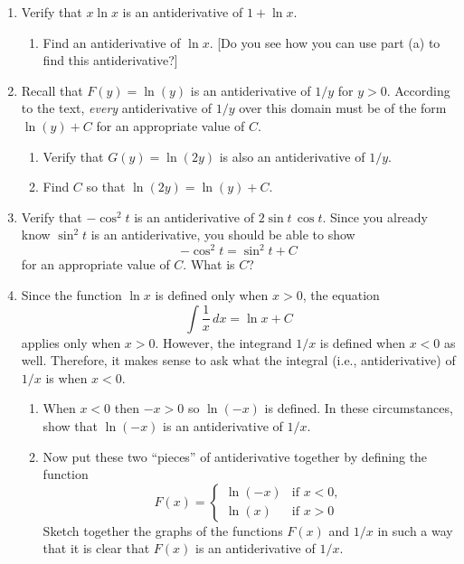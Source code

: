 \begin{enumerate}
\begin{enumerate}
\end{enumerate}
\item Verify that $x \ln{x}$ is an antiderivative of $1 + \ln{x}$.

  \begin{enumerate}
  \item Find an antiderivative of $\ln{x}$.  [Do you see how you can use
  part (a) to find this antiderivative?]



\end{enumerate}
\item Recall that $F(y) = \ln(y)$ is an antiderivative of $1/y$ for
$y>0$.  According to the text, {\em every\/} antiderivative of $1/y$
over this domain must be of the form $\ln(y) + C$ for an appropriate
value of $C$.

  \begin{enumerate}
  \item Verify that $G(y) = \ln(2y)$ is also an antiderivative of $1/y$.

  \item Find $C$ so that $\ln(2y) = \ln(y) + C$.


\end{enumerate}
\item Verify that $-\cos^2{t}$ is an antiderivative of $2\sin{t} \,
\cos{t}$.  Since you already know $\sin^2{t}$ is an antiderivative,
you should be able to show
	\[
-\cos^2{t} = \sin^2{t} + C
\]
for an appropriate value of $C$.  What is $C$?


\item Since\label{log} the function $\ln{x}$ is defined only when $x >
0$, the equation
	\[
\int \dfrac{1}{x} \, dx = \ln{x} + C
\]
applies only when $x > 0$.  However, the integrand $1/x$ is defined
when $x < 0$ as well.  Therefore, it makes sense to ask what the
integral (i.e., antiderivative) of $1/x$ is when $x < 0$.

  \begin{enumerate}
  \item When $x < 0$ then $ -x > 0$ so $\ln(-x)$ is defined.  In these
circumstances, show that $\ln(-x)$ is an antiderivative of $1/x$.

  \item Now put these two ``pieces'' of antiderivative together by
defining the function
\[
F(x) = \begin{cases}
\ln(-x)  &\mbox{if $x < 0$}, \\
\ln(x)   &\mbox{if $x > 0$}
\end{cases}
\]
Sketch together the graphs of the functions $F(x)$ and $1/x$ in such a
way that it is clear that $F(x)$ is an antiderivative of $1/x$.


\end{enumerate}
\end{enumerate}
